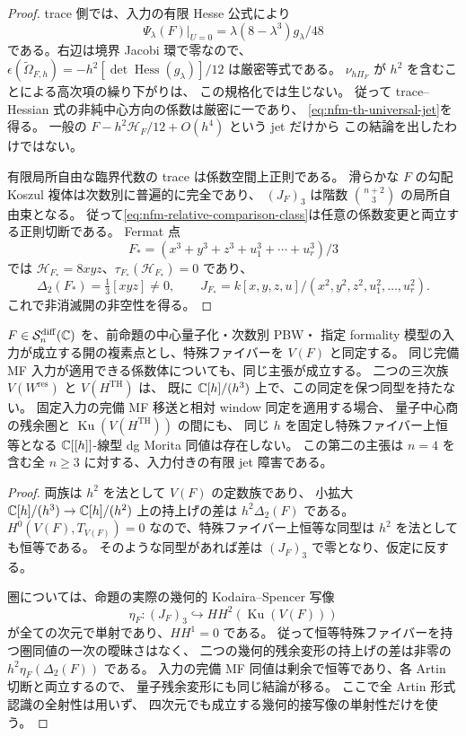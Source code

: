 \begin{proof}
trace 側では、入力の有限 Hesse 公式により
\[
 \Psi_\lambda(F)|_{U=0}
       =\lambda(8-\lambda^3)g_\lambda/48
\]
である。右辺は境界 Jacobi 環で零なので、
$\epsilon(\widetilde\Omega_{F,h})=-h^2[\det\operatorname{Hess}(g_\lambda)]/12$
は厳密等式である。
$\nu_{h\Pi_F}$ が $h^2$ を含むことによる高次項の繰り下がりは、
この規格化では生じない。
従って trace--Hessian 式の非純中心方向の係数は厳密に一であり、
\eqref{eq:nfm-th-universal-jet}を得る。
一般の $F-h^2\mathscr H_F/12+O(h^4)$ という jet だけから
この結論を出したわけではない。

有限局所自由な臨界代数の trace は係数空間上正則である。
滑らかな $F$ の勾配 Koszul 複体は次数別に普遍的に完全であり、
$(J_F)_3$ は階数 $\binom{n+2}{3}$ の局所自由束となる。
従って\eqref{eq:nfm-relative-comparison-class}は任意の係数変更と両立する正則切断である。
Fermat 点
\[
 F_*=(x^3+y^3+z^3+u_1^3+\cdots+u_r^3)/3
\]
では $\mathscr H_{F_*}=8xyz$、$\tau_{F_*}(\mathscr H_{F_*})=0$ であり、
\[
 \Delta_2(F_*)=\tfrac13[xyz]\ne0,
 \qquad J_{F_*}=k[x,y,z,u]/(x^2,y^2,z^2,u_1^2,\ldots,u_r^2).
\]
これで非消滅開の非空性を得る。
\end{proof}

\begin{corollary}[一般混合係数での標識付き形式比較の障害]
\label{cor:nfm-generic-marked-comparison-obstruction}
$F\in\mathcal S_n^{\mathrm{diff}}(\mathbb C)$ を、前命題の中心量子化・次数別 PBW・
指定 formality 模型の入力が成立する開の複素点とし、特殊ファイバーを $V(F)$ と同定する。
同じ完備 MF 入力が適用できる係数体についても、同じ主張が成立する。
二つの三次族 $V(W^{\mathrm{res}})$ と $V(H^{\mathrm{TH}})$ は、
既に $\mathbb C[h]/(h^3)$ 上で、この同定を保つ同型を持たない。
固定入力の完備 MF 移送と相対 window 同定を適用する場合、
量子中心商の残余圏と $\operatorname{Ku}(V(H^{\mathrm{TH}}))$ の間にも、
同じ $h$ を固定し特殊ファイバー上恒等となる
$\mathbb C[[h]]$-線型 dg Morita 同値は存在しない。
この第二の主張は $n=4$ を含む全 $n\ge3$ に対する、入力付きの有限 jet 障害である。
\end{corollary}

\begin{proof}
両族は $h^2$ を法として $V(F)$ の定数族であり、
小拡大 $\mathbb C[h]/(h^3)\to\mathbb C[h]/(h^2)$ 上の持上げの差は
$h^2\Delta_2(F)$ である。
$H^0(V(F),T_{V(F)})=0$ なので、特殊ファイバー上恒等な同型は
$h^2$ を法としても恒等である。
そのような同型があれば差は $(J_F)_3$ で零となり、仮定に反する。

圏については、命題の実際の幾何的 Kodaira--Spencer 写像
\[
 \eta_F:(J_F)_3\hookrightarrow HH^2(\operatorname{Ku}(V(F)))
\]
が全ての次元で単射であり、$HH^1=0$ である。
従って恒等特殊ファイバーを持つ圏同値の一次の曖昧さはなく、
二つの幾何的残余変形の持上げの差は非零の
$h^2\eta_F(\Delta_2(F))$ である。
入力の完備 MF 同値は剰余で恒等であり、各 Artin 切断と両立するので、
量子残余変形にも同じ結論が移る。
ここで全 Artin 形式認識の全射性は用いず、
四次元でも成立する幾何的接写像の単射性だけを使う。
\end{proof}

